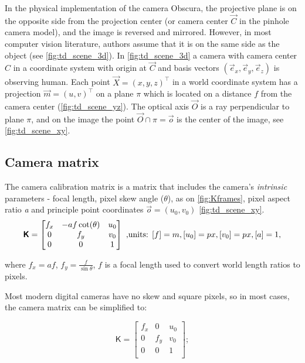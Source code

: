 In the physical implementation of the camera Obscura, the projective plane is on the opposite side from the projection center (or camera center $\vec{C}$ in the pinhole camera model), and the image is reversed and mirrored. 
However, in most computer vision literature, authors assume that it is on the same side as the object (see \autoref{fig:td_scene_3d}).
In \autoref{fig:td_scene_3d} a camera with camera center $C$ in a coordinate system with origin at $\vec{C}$ and basis vectors $(\vec{e}_x, \vec{e}_y, \vec{e}_z)$ is observing human. 
Each point $\vec{X} = (x, y, z)^\top$ in a world coordinate system has a projection $\vec{m} = (u, v)^\top$ on a plane $\pi$ which is located on a distance $f$ from the camera center (\autoref{fig:td_scene_yz}). 
The optical axis $\vec{O}$ is a ray perpendicular to plane $\pi$, and on the image the point $ \vec{O} \cap \pi = \vec{o}$ is the center of the image, see \autoref{fig:td_scene_xy}.

\subsection{Camera matrix}
The camera calibration matrix is a matrix that includes the camera's \textit{intrinsic} parameters - focal length, pixel skew angle ($\theta$), as on \autoref{fig:Kframes}, pixel aspect ratio \textit{a} and principle point coordinates $\vec{o} = (u_0, v_0)$ \autoref{fig:td_scene_xy}.
\begin{equation}
    \pmb{\mathsf{K}} = \begin{bmatrix}
        f_x & -a f \cot(\theta) & u_0 \\
        0 & f_y & v_0 \\
        0 & 0 & 1 \\
    \end{bmatrix} 
    \textrm{ ,units: } [f]=m, [u_0]=px, [v_0]=px, [a]=1,
\end{equation}

where $f_x = af$, $f_y = \frac{f}{\sin{\theta}}$, $f$ is a focal length used to convert world length ratios to pixels.

Most modern digital cameras have no skew and square pixels, so in most cases, the camera matrix can be simplified to:

\begin{equation}
    \label{eq:kmat}
    \pmb{\mathsf{K}} = \begin{bmatrix}
        f_x & 0 & u_0 \\
        0 & f_y & v_0 \\
        0 & 0 & 1 \\
    \end{bmatrix};
\end{equation}

